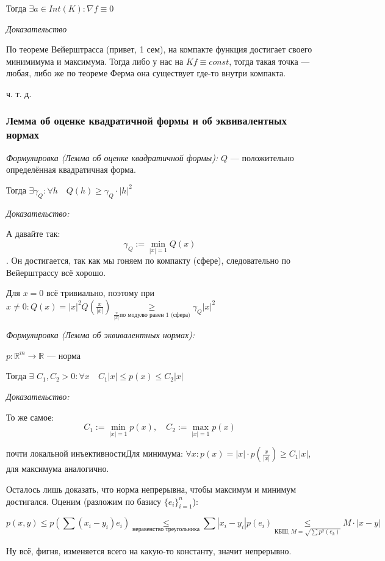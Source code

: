 \documentclass{article}
\def\dbl{\,\,}
\begin{document}
Тогда $\exists a \in Int(K): \nabla f \equiv 0$

\textit{Доказательство}

По теореме Вейерштрасса (привет, 1 сем), на компакте функция достигает своего минимимума и максимума.
Тогда либо у нас на $K f \equiv const$, тогда такая точка --- любая, либо же по теореме Ферма она существует где-то внутри компакта.

ч. т. д.



\subsubsection{Лемма об оценке квадратичной формы и об эквивалентных нормах}
\textit{Формулировка (Лемма об оценке квадратичной формы):}
$Q$ --- положительно определённая квадратичная форма.

Тогда $\exists \gamma_Q: \forall h \quad Q(h) \ge \gamma_Q \cdot |h|^2$

\textit{Доказательство:}

А давайте так: $$\gamma_Q := \min_{|x| = 1}{Q(x)}$$. Он достигается, так как мы гоняем по компакту (сфере), следовательно по Вейерштрассу всё хорошо.

Для $x = 0$ всё тривиально, поэтому при $x \neq 0: Q(x) = |x|^2Q(\frac{x}{|x|}) \underset{\frac{x}{|x|}\text{по модулю равен 1 (сфера)}}{\ge} \gamma_Q|x|^2$

\textit{Формулировка (Лемма об эквивалентных нормах):}

$p: \mathbb{R}^m \rightarrow \mathbb{R}$ --- норма

Тогда $\exists \dbl C_1, C_2 > 0: \forall x \quad C_1|x| \le p(x) \le C_2|x|$

\textit{Доказательство:}

То же самое: $$C_1 := \min_{|x| = 1}{p(x)}, \quad C_2 := \max_{|x| = 1}{p(x)}$$

почти локальной инъективностиДля минимума: $\forall x: p(x) = |x| \cdot p(\frac{x}{|x|}) \ge C_1|x|$, для максимума аналогично.

Осталось лишь доказать, что норма непрерывна, чтобы максимум и минимум достигался. Оценим (разложим по базису $\{e_i\}_{i = 1}^{n}$):

\[p(x, y) \le p\left(\sum (x_i - y_i)e_i\right) \underset{\text{неравенство треугольника}}{\le} \sum|x_i - y_i|p(e_i) \underset{\text{КБШ}, M = \sqrt{\sum p^2(e_k)}}{\le} M \cdot |x - y|\]

Ну всё, фигня, изменяется всего на какую-то константу, значит непрерывно.
\end{document}

